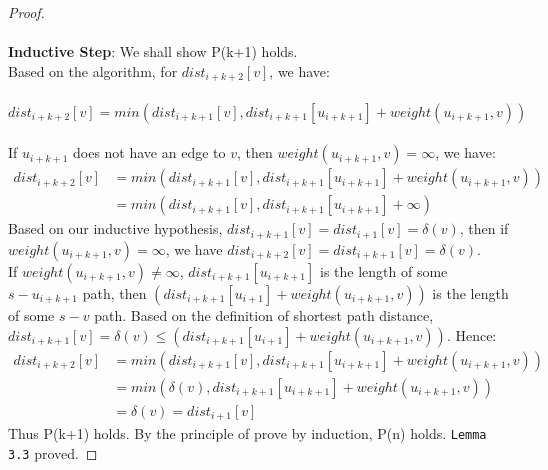 \documentclass[11pt, oneside]{article}   	%
\newcommand\tab[1][1cm]{\hspace*{#1}}
\theoremstyle{definition}
\begin{document}
\begin{proof}
\\\\
\textbf{Inductive Step}: We shall show P(k+1) holds. 
\\
Based on the algorithm, for $dist_{i+k+2}[v]$, we have: 
\\\\
  \tab $dist_{i+k+2}[v] = min(dist_{i+k+1}[v], dist_{i+k+1}[u_{i+k+1}] + weight(u_{i+k+1}, v))$
\\\\
If $u_{i+k+1}$ does not have an edge to $v$, then $weight(u_{i+k+1}, v) = \infty$, we have: 
\begin{align*}
    dist_{i+k+2}[v] &= min(dist_{i+k+1}[v], dist_{i+k+1}[u_{i+k+1}] + weight(u_{i+k+1}, v)) \\
                    &= min(dist_{i+k+1}[v], dist_{i+k+1}[u_{i+k+1}] + \infty) 
\end{align*}
Based on our inductive hypothesis, $dist_{i+k+1}[v] = dist_{i+1}[v] = \delta(v)$, then if $weight(u_{i+k+1}, v) = \infty$, we have $dist_{i+k+2}[v] = dist_{i+k+1}[v] = \delta(v)$. 
\\
If $weight(u_{i+k+1}, v) \neq \infty$, $dist_{i+k+1}[u_{i+k+1}] $ is the length of some $s-u_{i+k+1}$ path, then $(dist_{i+k+1}[u_{i+1}] + weight(u_{i+k+1}, v))$ is the length of some $s-v$ path. Based on the definition of shortest path distance, $dist_{i+k+1}[v] = \delta(v) \leq (dist_{i+k+1}[u_{i+1}] + weight(u_{i+k+1}, v))$. Hence: 
\begin{align*}
  dist_{i+k+2}[v] &= min(dist_{i+k+1}[v], dist_{i+k+1}[u_{i+k+1}] + weight(u_{i+k+1}, v)) \\
                  &= min(\delta(v), dist_{i+k+1}[u_{i+k+1}] + weight(u_{i+k+1}, v))\\
                  &= \delta(v) = dist_{i+1}[v]
\end{align*}
Thus P(k+1) holds. By the principle of prove by induction, P(n) holds. \texttt{Lemma 3.3} proved. 
\end{proof}
\end{document}
